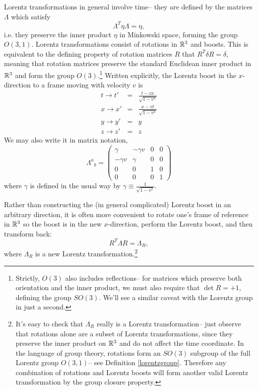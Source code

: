 Lorentz transformations in general involve time-- they are defined by the matrices $\Lambda$ which satisfy
$$\Lambda^T \eta \Lambda= \eta,$$
i.e. they preserve the inner product $\eta$ in Minkowski space, forming the group $O(3,1)$. Lorentz transformations consist of rotations in $\mathbb{R}^3$ and boosts. This is equivalent to the defining property of rotation matrices $R$ that $R^T \delta R=\delta$, meaning that rotation matrices preserve the standard Euclidean inner product in $\mathbb{R}^3$ and form the group $O(3)$.\footnote{Strictly, $O(3)$ also includes reflections-- for matrices which preserve both orientation and the inner product, we must also require that $\det R=+1$, defining the group $SO(3)$. We'll see a similar caveat with the Lorentz group in just a second.}
Written explicitly, the Lorentz boost in the $x$-direction to a frame moving with velocity $v$ is
\begin{eqnarray*}
t\to t'&=&\frac{t-vx}{\sqrt{1-v^2}}\\
x\to x'&=&\frac{x-vt}{\sqrt{1-v^2}}\\
y\to y'&=&y\\
z\to z'&=&z
\end{eqnarray*}
We may also write it in matrix notation,
$${\Lambda^a}_b =
\begin{pmatrix}
\gamma&-\gamma v &0 & 0\\
-\gamma v & \gamma & 0 & 0\\
0&0&1&0\\
0&0&0&1
\end{pmatrix}$$
where $\gamma$ is defined in the usual way by $\gamma \equiv \frac{1}{\sqrt{1-v^2}}$.

Rather than constructing the (in general complicated) Lorentz boost in an arbitrary direction, it is often more convenient to rotate one's frame of reference in $\mathbb{R}^3$ so the boost is in the new $x$-direction, perform the Lorentz boost, and then transform back:
$$R^T \Lambda R= \Lambda_R,$$
where $\Lambda_R$ is a new Lorentz transformation.\footnote{It's easy to check that $\Lambda_R$ really is a Lorentz transformation-- just observe that rotations alone are a subset of Lorentz transformations, since they preserve the inner product on $\mathbb{R}^3$ and do not affect the time coordinate. In the language of group theory, rotations form an $SO(3)$ subgroup of the full Lorentz group $O(3,1)$-- see Definition \ref{lorentzgroup}. Therefore any combination of rotations and Lorentz boosts will form another valid Lorentz transformation by the group closure property.}

